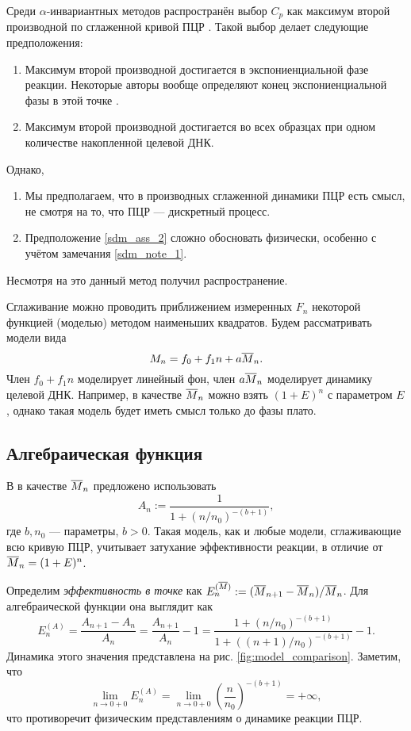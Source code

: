 Среди $\alpha$-инвариантных методов распространён выбор $C_{p}$ как максимум
второй производной по сглаженной кривой ПЦР
\cite{rasmussenQuantificationLightCycler2001}. Такой выбор делает следующие
предположения:
\begin{enumerate}[label=(\alph*)]
  \item{}Максимум второй производной достигается в экспониенциальной фазе
  реакции. Некоторые авторы вообще определяют конец экспониенциальной фазы
  в этой точке \cite{tichopadStandardizedDeterminationRealtime2003,
    zhaoComprehensiveAlgorithmQuantitative2005}.
  \item{}Максимум второй производной достигается во всех образцах при одном
  количестве накопленной целевой ДНК.\label{sdm_ass_2}
\end{enumerate}
Однако,
\begin{enumerate}[label=(\roman*)]
  \item{}Мы предполагаем, что в производных сглаженной динамики ПЦР есть
  смысл, не смотря на то, что ПЦР --- дискретный процесс.\label{sdm_note_1}
  \item{}Предположение \ref{sdm_ass_2} сложно обосновать физически, особенно с
  учётом замечания \ref{sdm_note_1}.\label{sdm_note_2}
\end{enumerate}
Несмотря на это данный метод получил распространение.

Сглаживание можно проводить приближением измеренных $F_{n}$ некоторой функцией
(моделью) методом наименьших квадратов. Будем рассматривать модели вида
\[
  M_{n}=f_0+f_1n+a\overline{M}_{n}.
\]
Член $f_0+f_1n$ моделирует линейный фон, член $a\overline{M}_{n}$ моделирует
динамику целевой ДНК. Например, в качестве $\overline{M}_{n}$ можно взять
$(1+E)^{n}$ с параметром $E$, однако такая модель будет иметь смысл только до
фазы плато.

\subsection{Алгебраическая функция}

В
\cite{tichopadStandardizedDeterminationRealtime2003,zhaoComprehensiveAlgorithmQuantitative2005}
в качестве $\overline{M}_{n}$ предложено использовать
\[
  A_{n}:=\frac{1}{1+(n/n_0)^{-(b+1)}},
\]
где $b,n_0$ --- параметры, $b>0$. Такая модель, как и любые модели,
сглаживающие всю кривую ПЦР, учитывает затухание эффективности реакции, в
отличие от $\overline{M}_{n}=(1+E)^{n}$.

Определим {\it эффективность в точке} как
$E^{(\overline{M})}_{n}:=(\overline{M}_{n+1}-\overline{M}_{n})/\overline{M}_{n}$. Для алгебраической
функции она выглядит как
\[
  E^{(A)}_{n}=\frac{A_{n+1}-A_{n}}{A_{n}}=\frac{A_{n+1}}{A_{n}}-1=
  \frac{1+(n/n_0)^{-(b+1)}}{1+((n+1)/n_0)^{-(b+1)}}-1.
\]
Динамика этого значения представлена на рис. \ref{fig:model_comparison}.
Заметим, что
\[
  \lim_{n\to 0+0}E^{(A)}_{n}=
  \lim_{n\to 0+0}\left(\frac{n}{n_0}\right)^{-(b+1)}=+\infty,
\]
что противоречит физическим представлениям о динамике реакции ПЦР.


